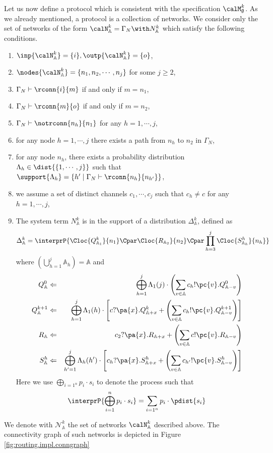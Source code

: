 \documentclass{LMCS}
\begin{document}
Let us now define a protocol which is consistent with 
the specification $\calM^k_{\emptyset}$. 
As we already mentioned, a protocol is a collection of 
networks. 
We consider only the set of networks of the form 
$\calN^k_{\mathbb{A}} = \Gamma_N \with N^k_{\mathbb{A}}$ which satisfy the 
following conditions.

\begin{enumerate}
\item $\inp{\calN^k_{\mathbb{A}}} = \{i\}, \outp{\calN^k_{\mathbb{A}}} = \{o\}$,
\item $\nodes{\calN^k_{\mathbb{A}}} = \{n_1, n_2, \cdots, n_j\}$ for some 
$j \geq 2$, 
\item $\Gamma_N \vdash \rconn{i}{m}$ if and only if $m = n_1$, 
\item $\Gamma_N \vdash \rconn{m}{o}$ if and only if $m = n_2$,
\item $\Gamma_N \vdash \notrconn{n_h}{n_1}$ for any $h=1,\cdots, j$, 
\item for any node $h = 1,\cdots,j$ there exists a path 
from $n_h$ to $n_2$ in $\Gamma_N$,
\item for any node $n_h$, there exists a probability 
distribution $\Lambda_h \in \dist{\{1,\cdots,j\}}$ such that 
$\support{\Lambda_h} = \{h' \;|\; \Gamma_N \vdash \rconn{n_h}{n_{h'}}\}$, 
\item we assume a set of distinct channels $c_1, \cdots, c_j$ such that 
$c_h \neq c$ for any $h=1,\cdots, j$, 
\item The system term $N^k_{\mathbb{A}}$ is in the 
support of a distribution $\Delta^k_{\mathbb{A}}$, defined as 
\[
\Delta^k_{\mathbb{A}} = \interprP{\Cloc{Q^k_{\mathbb{A}_1}}{n_1} \Cpar \Cloc{R_{\mathbb{A}_2}}{n_2} 
\Cpar \prod_{h=3}^j \Cloc{S^h_{\mathbb{A}_h}}{n_h}}
\]
where $\left(\bigcup_{h=1}^j \mathbb{A}_h \right) = \mathbb{A}$ and 
\begin{eqnarray*}
Q^0_{\mathbb{A}} &\Leftarrow& \bigoplus_{h=1}^j \Lambda_1(j) 
\cdot \left(\sum_{v \in \mathbb{A}} c_h!\pc{v}.Q^0_{\mathbb{A} - v}\right)\\
Q^{k+1}_{\mathbb{A}} &\Leftarrow& \bigoplus_{h=1}^j \Lambda_1(h) \cdot 
\left[ c?\pa{x}.Q^{k}_{\mathbb{A} + x} + \left(\sum_{v \in \mathbb{A}} c_h!\pc{v}.Q^{k+1}_{\mathbb{A} - v}\right)\right]\\
R_{\mathbb{A}} &\Leftarrow& c_2?\pa{x}.R_{\mathbb{A} + x} + \left(\sum_{v \in \mathbb{A}} c!\pc{v}.R_{\mathbb{A}-v}\right)\\
S^h_{\mathbb{A}} &\Leftarrow& \bigoplus_{h'=1}^j \Lambda_{h}(h') \cdot 
\left[c_h?\pa{x}.S^h_{\mathbb{A} + x} + \left(\sum_{v \in \mathbb{A}} c_{h'}!\pc{v}.S^h_{\mathbb{A} - v}\right)\right] 
\end{eqnarray*}
Here we use $\bigoplus_{i=1^n}p_i \cdot s_i$ to denote the process such that 
\[
\interprP{\bigoplus_{i=1}^n p_i \cdot s_i} = \sum_{i=1^n} p_i \cdot \pdist{s_i}
\]
\end{enumerate}
\noindent
We denote with $\mathscr{N}^k_{\mathbb{A}}$ the set of networks 
$\calN^k_{\mathbb{A}}$ described above. The connectivity graph 
of such networks is depicted in Figure \ref{fig:routing.impl.conngraph}
\end{document}

